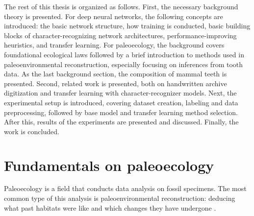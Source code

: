 \documentclass{article}
\begin{document}
The rest of this thesis is organized as follows. First, the necessary background theory is 
presented. For deep neural networks, the following concepts are introduced:
the basic network structure, how training is conducted, basic building blocks of character-recognizing network architectures, performance-improving 
heuristics, and transfer learning. For paleoecology, the background covers 
foundational ecological laws followed by a brief introduction to methods used in
paleoenvironmental reconstruction, especially focusing on inferences from tooth data.
As the last background section, the composition of mammal teeth is presented. 
Second, related work is presented, both on
handwritten archive digitization and transfer learning with character-recognizer models.
Next, the experimental setup is introduced, covering dataset creation, labeling and data 
preprocessing, followed by base model and transfer learning method selection. After this, 
results of the experiments are presented and discussed. Finally, the work is concluded.

\section{Fundamentals on paleoecology}

Paleoecology is a field that conducts data analysis on fossil specimens. The most common type of 
this analysis is paleoenvironmental reconstruction: deducing what past habitats were like and which 
changes they have undergone \cite{Faith_Lyman_2019}.
\end{document}
